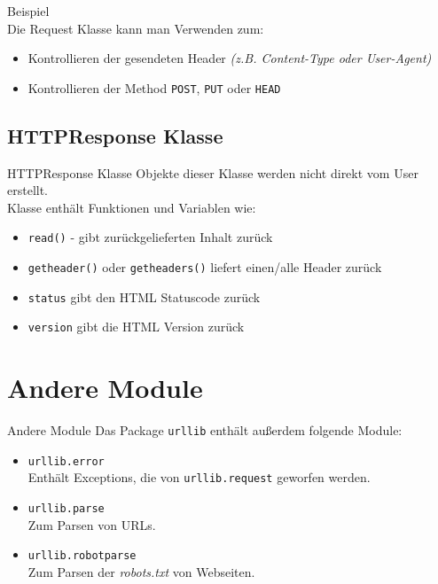\begin{frame}{Beispiel}
	 \ \\[.5cm]
	Die Request Klasse kann man Verwenden zum:
	\begin{itemize}
		\item Kontrollieren der gesendeten Header \textit{(z.B. Content-Type oder User-Agent)}
		\item Kontrollieren der Method \texttt{POST}, \texttt{PUT} oder \texttt{HEAD}
	\end{itemize}
\end{frame}

\subsection{HTTPResponse Klasse}
\begin{frame}[fragile]{HTTPResponse Klasse}
	Objekte dieser Klasse werden nicht direkt vom User erstellt.
	 \ \\[.5cm]
	Klasse enthält Funktionen und Variablen wie:
	\begin{itemize}
		\item \texttt{read()} - gibt zurückgelieferten Inhalt zurück
		\item \texttt{getheader()} oder \texttt{getheaders()} liefert einen/alle Header zurück
		\item \texttt{status} gibt den HTML Statuscode zurück
		\item \texttt{version} gibt die HTML Version zurück
	\end{itemize}
\end{frame}


\section{Andere Module}
\begin{frame}[fragile]{Andere Module}
	Das Package \alert{\texttt{urllib}} enthält au{\ss}erdem folgende Module:
	\begin{itemize}
		\item \texttt{urllib.error} \ \\
			Enthält Exceptions, die von \texttt{urllib.request} geworfen werden.
		\item \texttt{urllib.parse} \ \\
			Zum Parsen von URLs.
		\item \texttt{urllib.robotparse} \ \\
			Zum Parsen der \textit{robots.txt} von Webseiten.
	\end{itemize}
\end{frame}


